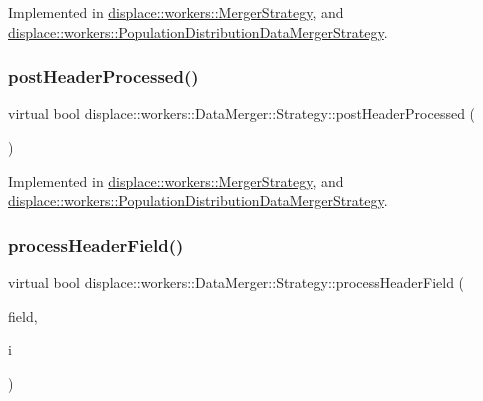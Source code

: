 Implemented in \mbox{\hyperlink{classdisplace_1_1workers_1_1_merger_strategy_addc43b70950fe76253fcfcf7975fc299}{displace\+::workers\+::\+Merger\+Strategy}}, and \mbox{\hyperlink{classdisplace_1_1workers_1_1_population_distribution_data_merger_strategy_a91d2c393f913bed2f4b276fbddb2c4c8}{displace\+::workers\+::\+Population\+Distribution\+Data\+Merger\+Strategy}}.

\mbox{\label{classdisplace_1_1workers_1_1_data_merger_1_1_strategy_a2ef649650a70b8f1b60ccfe432e6ab5e}} 
\subsubsection{\texorpdfstring{postHeaderProcessed()}{postHeaderProcessed()}}
{\footnotesize\ttfamily virtual bool displace\+::workers\+::\+Data\+Merger\+::\+Strategy\+::post\+Header\+Processed (\begin{DoxyParamCaption}{ }\end{DoxyParamCaption})\hspace{0.3cm}{\ttfamily [pure virtual]}}



Implemented in \mbox{\hyperlink{classdisplace_1_1workers_1_1_merger_strategy_a13652dd462cd7e666222952d84963132}{displace\+::workers\+::\+Merger\+Strategy}}, and \mbox{\hyperlink{classdisplace_1_1workers_1_1_population_distribution_data_merger_strategy_a9b777133a622972bb5d8008753b3b6df}{displace\+::workers\+::\+Population\+Distribution\+Data\+Merger\+Strategy}}.

\mbox{\label{classdisplace_1_1workers_1_1_data_merger_1_1_strategy_a00c094e55d6d8413710368af55c55224}} 
\subsubsection{\texorpdfstring{processHeaderField()}{processHeaderField()}}
{\footnotesize\ttfamily virtual bool displace\+::workers\+::\+Data\+Merger\+::\+Strategy\+::process\+Header\+Field (\begin{DoxyParamCaption}\item[{Q\+String}]{field,  }\item[{int}]{i }\end{DoxyParamCaption})\hspace{0.3cm}{\ttfamily [pure virtual]}}



